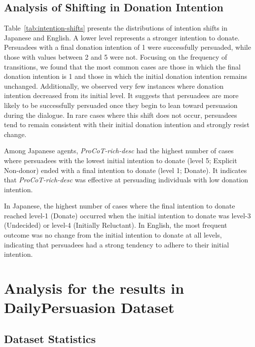 \documentclass[11pt]{article}
\begin{document}
\subsection{Analysis of Shifting in Donation Intention}
\label{seq:appendix_analysis_of_shifting}
Table~\ref{tab:intention-shifts} presents the distributions of intention shifts in Japanese and English.
 A lower level represents a stronger intention to donate.
Persuadees with a final donation intention of 1 were successfully persuaded, while those with values between 2 and 5 were not.
Focusing on the frequency of transitions, we found that the most common cases are those in which the final donation intention is 1 and those in which the initial donation intention remains unchanged.
Additionally, we observed very few instances where donation intention decreased from its initial level.
It suggests that persuadees are more likely to be successfully persuaded once they begin to lean toward persuasion during the dialogue. 
In rare cases where this shift does not occur, persuadees tend to remain consistent with their initial donation intention and strongly resist change.

Among Japanese agents, \textit{ProCoT-rich-desc} had the highest number of cases where persuadees with the lowest initial intention to donate (level 5; Explicit Non-donor) ended with a final intention to donate (level 1; Donate).
It indicates that \textit{ProCoT-rich-desc} was effective at persuading individuals with low donation intention.

In Japanese, the highest number of cases where the final intention to donate reached level-1 (Donate) occurred when the initial intention to donate was level-3 (Undecided) or level-4 (Initially Reluctant). 
In English, the most frequent outcome was no change from the initial intention to donate at all levels, indicating that persuadees had a strong tendency to adhere to their initial intention.


\section{Analysis for the results in DailyPersuasion Dataset}
\label{sec:daily-persuasion-analysis}

\subsection{Dataset Statistics}
\label{sec:daily-persuasion-data}
\end{document}
